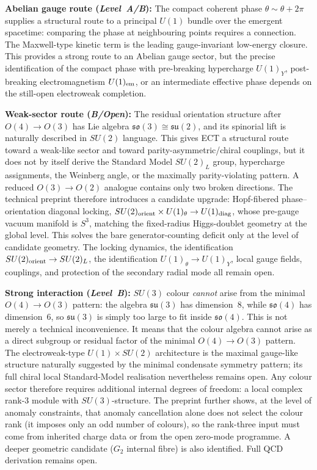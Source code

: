 \documentclass[11pt,a4paper]{article}
\begin{document}
\textbf{Abelian gauge route (\emph{Level~A/B}):} The compact coherent phase $\theta\sim\theta+2\pi$ supplies a structural route to a principal $U(1)$ bundle over the emergent spacetime: comparing the phase at neighbouring points requires a connection. The Maxwell-type kinetic term is the leading gauge-invariant low-energy closure. This provides a strong route to an Abelian gauge sector, but the precise identification of the compact phase with pre-breaking hypercharge $U(1)_Y$, post-breaking electromagnetism $U(1)_{\rm em}$, or an intermediate effective phase depends on the still-open electroweak completion.

\textbf{Weak-sector route (\emph{B/Open}):} The residual orientation structure after $O(4)\to O(3)$ has Lie algebra $\mathfrak{so}(3)\cong\mathfrak{su}(2)$, and its spinorial lift is naturally described in $SU(2)$ language. This gives ECT a structural route toward a weak-like sector and toward parity-asymmetric/chiral couplings, but it does not by itself derive the Standard Model $SU(2)_L$ group, hypercharge assignments, the Weinberg angle, or the maximally parity-violating pattern. A reduced $O(3)\to O(2)$ analogue contains only two broken directions. The technical preprint therefore introduces a candidate upgrade: Hopf-fibered phase--orientation diagonal locking, $SU(2)_{\rm orient}\times U(1)_\theta\to U(1)_{\rm diag}$, whose pre-gauge vacuum manifold is $S^3$, matching the fixed-radius Higgs-doublet geometry at the global level. This solves the bare generator-counting deficit only at the level of candidate geometry. The locking dynamics, the identification $SU(2)_{\rm orient}\to SU(2)_L$, the identification $U(1)_\theta\to U(1)_Y$, local gauge fields, couplings, and protection of the secondary radial mode all remain open.

\textbf{Strong interaction (\emph{Level~B}):} $SU(3)$ colour \emph{cannot} arise from the minimal $O(4) \to O(3)$ pattern: the algebra $\mathfrak{su}(3)$ has dimension~8, while $\mathfrak{so}(4)$ has dimension~6, so $\mathfrak{su}(3)$ is simply too large to fit inside $\mathfrak{so}(4)$. This is not merely a technical inconvenience. It means that the colour algebra cannot arise as a direct subgroup or residual factor of the minimal $O(4)\to O(3)$ pattern. The electroweak-type $U(1)\times SU(2)$ architecture is the maximal gauge-like structure naturally suggested by the minimal condensate symmetry pattern; its full chiral local Standard-Model realisation nevertheless remains open. Any colour sector therefore requires additional internal degrees of freedom: a local complex rank-3 module with $SU(3)$-structure. The preprint further shows, at the level of anomaly constraints, that anomaly cancellation alone does not select the colour rank (it imposes only an odd number of colours), so the rank-three input must come from inherited charge data or from the open zero-mode programme. A deeper geometric candidate ($G_2$ internal fibre) is also identified. Full QCD derivation remains open.
\end{document}
